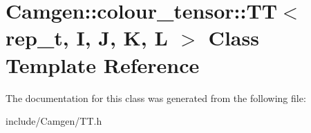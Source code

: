 \hypertarget{a00545}{}\section{Camgen\+:\+:colour\+\_\+tensor\+:\+:T\+T$<$ rep\+\_\+t, I, J, K, L $>$ Class Template Reference}
\label{a00545}


The documentation for this class was generated from the following file\+:\begin{DoxyCompactItemize}
\item 
include/\+Camgen/T\+T.\+h\end{DoxyCompactItemize}
